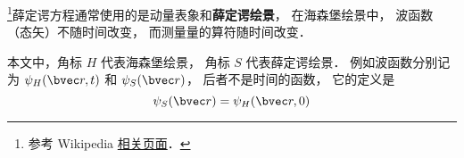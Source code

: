 



\footnote{参考 Wikipedia \href{https://en.wikipedia.org/wiki/Heisenberg_picture}{相关页面}．}薛定谔方程通常使用的是动量表象和\textbf{薛定谔绘景}， 在海森堡绘景中， 波函数（态矢）不随时间改变， 而测量量的算符随时间改变． 

本文中，角标 $H$ 代表海森堡绘景， 角标 $S$ 代表薛定谔绘景． 例如波函数分别记为 $\psi_H(\bvec r, t)$ 和 $\psi_S(\bvec r)$， 后者不是时间的函数， 它的定义是
\begin{equation}
\psi_S(\bvec r) = \psi_H(\bvec r, 0)
\end{equation}




